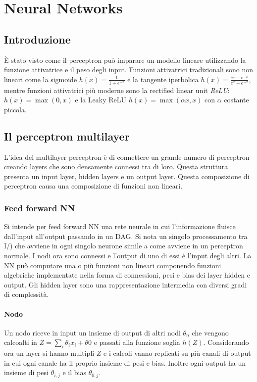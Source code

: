 \chapter{Neural Networks}

\section{Introduzione}
\`E stato visto come il perceptron pu\`o imparare un modello lineare utilizzando la funzione attivatrice e il peso degli input.
Funzioni attivatrici tradizionali sono non lineari come la sigmoide $h(x) = \frac{1}{1+e^{-x}}$ e la tangente iperbolica $h(x) = \frac{e^x-e^{-x}}{e^x+e^{-x}}$, mentre funzioni attivatrici pi\`u moderne sono la rectified linear unit \emph{ReLU}: $h(x) = \max(0,x)$ e la Leaky ReLU $h(x) = \max(\alpha x,x)$ con $\alpha$ costante piccola.

\section{Il perceptron multilayer}
L'idea del multilayer perceptron \`e di connettere un grande numero di perceptron creando layers che sono densamente connessi tra di loro.
Questa struttura presenta un input layer, hidden layers e un output layer.
Questa composizione di perceptron causa una composizione di funzioni non lineari.

	\subsection{Feed forward NN}
	Si intende per feed forward NN una rete neurale in cui l'informazione fluisce dall'input all'output passando in un DAG.
	Si nota un singolo processamento tra I/) che avviene in ogni singolo neurone simile a come avviene in un perceptron normale.
	I nodi ora sono connessi e l'output di uno di essi \`e l'input degli altri.
	La NN pu\`o computare una o pi\`u funzioni non lineari componendo funzioni algebriche implementate nella forma di connessioni, pesi e bias dei layer hidden e output.
	Gli hidden layer sono una rappresentazione intermedia con diversi gradi di complessit\`a.

		\subsubsection{Nodo}
		Un nodo riceve in input un insieme di output di altri nodi $\theta_n$ che vengono calcoalti in $Z=\sum\limits_i \theta_ix_i+\theta0$ e passati alla funzione soglia $h(Z)$.
		Considerando ora un layer si hanno multipli $Z$ e i calcoli vanno replicati su pi\`u canali di output in cui ogni canale ha il proprio insieme di pesi e bias.
		Inoltre ogni output ha un insieme di pesi $\theta_{i,j}$ e il bias $\theta_{0,j}$.

